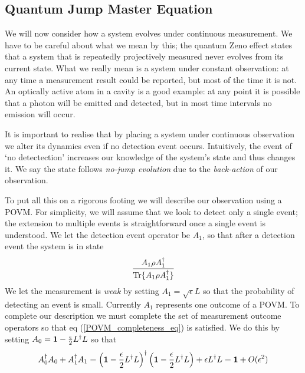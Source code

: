 \subsection{Quantum Jump Master Equation}

We will now consider how a system evolves under continuous measurement. We have to be careful about what we mean by this; the quantum Zeno effect \cite{quantum_zeno} states that a system that is repeatedly projectively measured never evolves from its current state. What we really mean is a system under constant observation: at any time a measurement result could be reported, but most of the time it is not. An optically active atom in a cavity is a good example: at any point it is possible that a photon will be emitted and detected, but in most time intervals no emission will occur.

It is important to realise that by placing a system under continuous observation we alter its dynamics even if no detection event occurs. Intuitively, the event of `no detectection' increases our knowledge of the system's state and thus changes it. We say the state follows \textit{no-jump evolution} due to the \textit{back-action} of our observation.

To put all this on a rigorous footing we will describe our observation using a POVM. For simplicity, we will assume that we look to detect only a single  event; the extension to multiple events is straightforward once a single event is understood. We let the detection event operator be $A_1$, so that after a detection event the system is in state
\begin{align}
  \frac{A_1 \rho A_1^\dagger}{\operatorname{Tr}\{A_1 \rho A_1^\dagger\}}
\end{align}
We let the measurement is \textit{weak} by setting $A_1 = \sqrt{\epsilon} L$ so that the probability of detecting an event is small. Currently $A_1$ represents one outcome of a POVM. To complete our description we must complete the set of measurement outcome operators so that eq (\ref{POVM_completeness_eq}) is satisfied. We do this by setting $A_0 = \mathbf{1} - \frac{\epsilon}{2} L^\dagger L$ so that
\begin{align}
  A_0^\dagger A_0 + A_1^\dagger A_1 = \left( \mathbf{1} - \frac{\epsilon}{2} L^\dagger L\right)^\dagger \left( \mathbf{1} - \frac{\epsilon}{2} L^\dagger L\right) + \epsilon L^\dagger L = \mathbf{1} + O(\epsilon^2)
\end{align}

